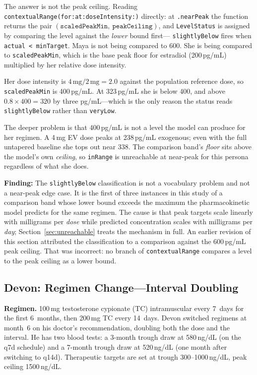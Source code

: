 \documentclass[11pt,a4paper]{article}
\newcommand{\code}[1]{\texttt{\small #1}}
\begin{document}
The answer is not the peak ceiling. Reading
\code{contextualRange(for:at:doseIntensity:)} directly: at
\code{.nearPeak} the function returns the pair
$(\texttt{scaledPeakMin},\ \texttt{peakCeiling})$, and \code{LevelStatus}
is assigned by comparing the level against the \emph{lower} bound first---
\code{slightlyBelow} fires when \code{actual < minTarget}. Maya is not
being compared to 600. She is being compared to
\code{scaledPeakMin}, which is the base peak floor for estradiol
(200\,pg/mL) multiplied by her relative dose intensity.

Her dose intensity is $4\,\text{mg} / 2\,\text{mg} = 2.0$ against the
population reference dose, so \code{scaledPeakMin} is 400\,pg/mL. At
323\,pg/mL she is below 400, and above $0.8 \times 400 = 320$ by three
pg/mL---which is the only reason the status reads \code{slightlyBelow}
rather than \code{veryLow}.

The deeper problem is that 400\,pg/mL is not a level the model can produce
for her regimen. A 4\,mg EV dose peaks at 238\,pg/mL exogenous; even with
the full untapered baseline she tops out near 338. The comparison band's
\emph{floor} sits above the model's own \emph{ceiling}, so
\code{inRange} is unreachable at near-peak for this persona regardless of
what she does.

\textbf{Finding:} The \code{slightlyBelow} classification is not a
vocabulary problem and not a near-peak edge case. It is the first of three
instances in this study of a comparison band whose lower bound exceeds the
maximum the pharmacokinetic model predicts for the same regimen. The cause
is that peak targets scale linearly with milligrams per \emph{dose} while
predicted concentration scales with milligrams per \emph{day};
Section~\ref{sec:unreachable} treats the mechanism in full. An earlier
revision of this section attributed the classification to a comparison
against the 600\,pg/mL peak ceiling. That was incorrect: no branch of
\code{contextualRange} compares a level to the peak ceiling as a lower
bound.

\subsection{Devon: Regimen Change---Interval Doubling}
\label{sec:devon}

\textbf{Regimen.} 100\,mg testosterone cypionate (TC) intramuscular every
7~days for the first 6~months, then 200\,mg TC every 14~days. Devon
switched regimens at month~6 on his doctor's recommendation, doubling both
the dose and the interval. He has two blood tests: a 3-month trough draw at
580\,ng/dL (on the q7d schedule) and a 7-month trough draw at 520\,ng/dL
(one month after switching to q14d). Therapeutic targets are set at trough
300--1000\,ng/dL, peak ceiling 1500\,ng/dL.
\end{document}
